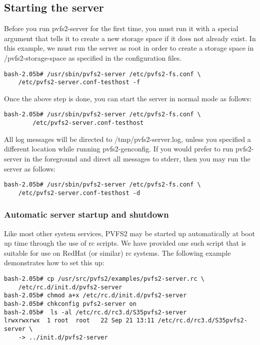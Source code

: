 \documentclass[11pt, letterpaper]{article}
\begin{document}
\subsection{Starting the server}

Before you run pvfs2-server for the first time, you must run it with a special 
argument that tells it to create a new storage space if it does not already 
exist.  In this example, we must run the server as root in order to create
a storage space in /pvfs2-storage-space as specified in the configuration
files.

\begin{verbatim}
bash-2.05b# /usr/sbin/pvfs2-server /etc/pvfs2-fs.conf \
	/etc/pvfs2-server.conf-testhost -f
\end{verbatim}

Once the above step is done, you can start the server in normal mode 
as follows:

\begin{verbatim}
bash-2.05b# /usr/sbin/pvfs2-server /etc/pvfs2-fs.conf \
		/etc/pvfs2-server.conf-testhost
\end{verbatim}

All log messages will be directed to /tmp/pvfs2-server.log, unless you specified
a different location while running pvfs2-genconfig.  If you would prefer to run 
pvfs2-server in the foreground and direct all messages to stderr, then 
you may run the server as follows:

\begin{verbatim}
bash-2.05b# /usr/sbin/pvfs2-server /etc/pvfs2-fs.conf \
	/etc/pvfs2-server.conf-testhost -d
\end{verbatim}

\subsubsection{Automatic server startup and shutdown}
\label{sec:rc}

Like most other system services, PVFS2 may be started up automatically
at boot up time through the use of rc scripts.  We have provided one
such script that is suitable for use on RedHat (or similar) rc
systems.  The following example demonstrates how to set this up:

\begin{verbatim}
bash-2.05b# cp /usr/src/pvfs2/examples/pvfs2-server.rc \
    /etc/rc.d/init.d/pvfs2-server
bash-2.05b# chmod a+x /etc/rc.d/init.d/pvfs2-server
bash-2.05b# chkconfig pvfs2-server on
bash-2.05b#  ls -al /etc/rc.d/rc3.d/S35pvfs2-server 
lrwxrwxrwx  1 root  root   22 Sep 21 13:11 /etc/rc.d/rc3.d/S35pvfs2-server \
    -> ../init.d/pvfs2-server
\end{verbatim}
\end{document}
